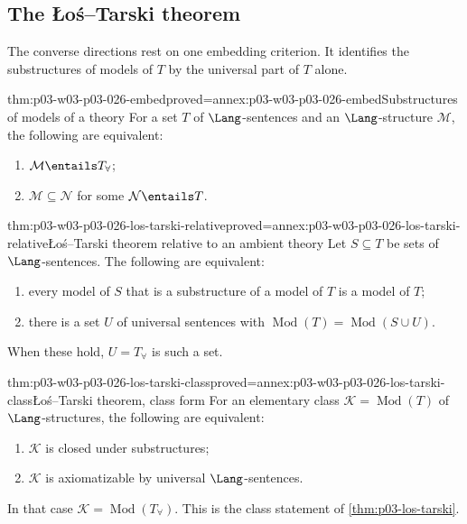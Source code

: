 \subsection{The \L o\'s--Tarski theorem}
\label{sec:p03-w03-p03-026-los-tarski}

The converse directions rest on one embedding criterion.  It identifies the
substructures of models of \(T\) by the universal part of \(T\) alone.

\begin{hblemma}{thm:p03-w03-p03-026-embed}{proved=annex:p03-w03-p03-026-embed}{Substructures of models of a theory}
For a set \(T\) of \(\Lang\)-sentences and an \(\Lang\)-structure
\(\mathcal M\), the following are equivalent:
\begin{enumerate}
 \item \(\mathcal M\entails T_{\forall}\);
 \item \(\mathcal M\subseteq\mathcal N\) for some \(\mathcal N\entails T\).
\end{enumerate}
\end{hblemma}

\begin{hbtheorem}{thm:p03-w03-p03-026-los-tarski-relative}{proved=annex:p03-w03-p03-026-los-tarski-relative}{\L o\'s--Tarski theorem relative to an ambient theory}
Let \(S\subseteq T\) be sets of \(\Lang\)-sentences.  The following are
equivalent:
\begin{enumerate}
 \item every model of \(S\) that is a substructure of a model of \(T\) is a
       model of \(T\);
 \item there is a set \(U\) of universal sentences with
       \(\operatorname{Mod}(T)=\operatorname{Mod}(S\cup U)\).
\end{enumerate}
When these hold, \(U=T_{\forall}\) is such a set.
\end{hbtheorem}

\begin{hbcorollary}{thm:p03-w03-p03-026-los-tarski-class}{proved=annex:p03-w03-p03-026-los-tarski-class}{\L o\'s--Tarski theorem, class form}
For an elementary class \(\mathcal K=\operatorname{Mod}(T)\) of
\(\Lang\)-structures, the following are equivalent:
\begin{enumerate}
 \item \(\mathcal K\) is closed under substructures;
 \item \(\mathcal K\) is axiomatizable by universal \(\Lang\)-sentences.
\end{enumerate}
In that case \(\mathcal K=\operatorname{Mod}(T_{\forall})\).  This is the
class statement of \cref{thm:p03-los-tarski}.
\end{hbcorollary}


